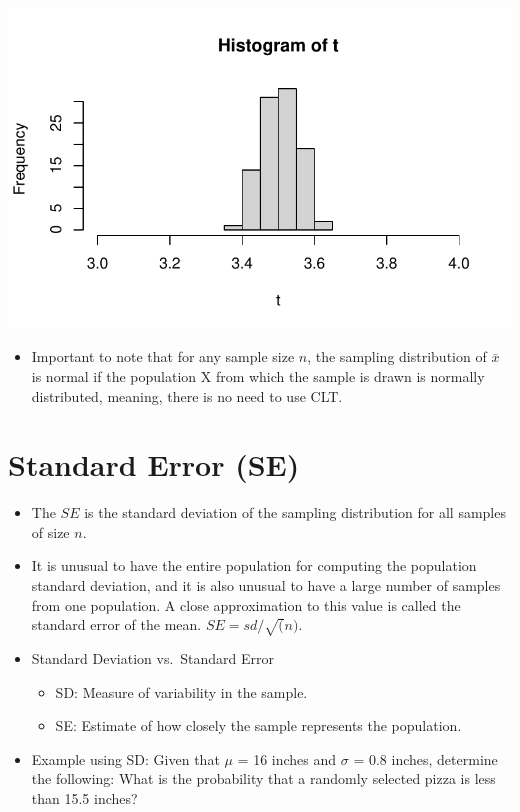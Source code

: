 \documentclass[
  letterpaper,
  DIV=11,
  numbers=noendperiod]{scrreprt}
\providecommand{\tightlist}{%
  \setlength{\itemsep}{0pt}\setlength{\parskip}{0pt}}\usepackage{longtable,booktabs,array}
\begin{document}
\includegraphics{probability_files/figure-pdf/unnamed-chunk-46-1.pdf}

\begin{itemize}
\tightlist
\item
  Important to note that for any sample size \(n\), the sampling
  distribution of \(\bar{x}\) is normal if the population X from which
  the sample is drawn is normally distributed, meaning, there is no need
  to use CLT.
\end{itemize}


\chapter{Standard Error (SE)}\label{standard-error-se}

\begin{itemize}
\item
  The \(SE\) is the standard deviation of the sampling distribution for
  all samples of size \(n\).
\item
  It is unusual to have the entire population for computing the
  population standard deviation, and it is also unusual to have a large
  number of samples from one population. A close approximation to this
  value is called the standard error of the mean. \(SE=sd/\sqrt(n)\).
\item
  Standard Deviation vs.~Standard Error

  \begin{itemize}
  \tightlist
  \item
    SD: Measure of variability in the sample.
  \item
    SE: Estimate of how closely the sample represents the population.
  \end{itemize}
\item
  Example using SD: Given that \(\mu\) = 16 inches and \(\sigma\) = 0.8
  inches, determine the following: What is the probability that a
  randomly selected pizza is less than 15.5 inches?
\end{itemize}
\end{document}
